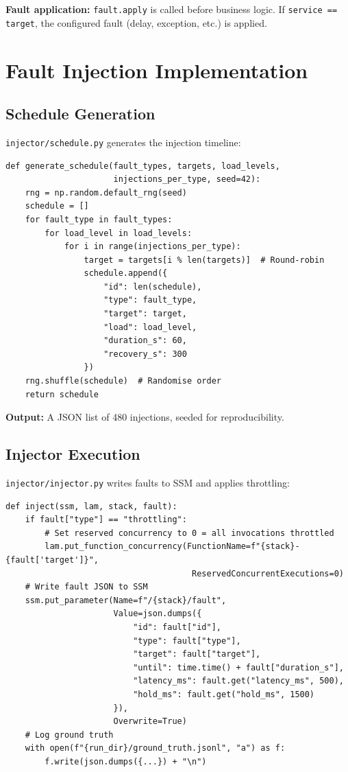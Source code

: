 \textbf{Fault application:} \texttt{fault.apply} is called before business logic. If \texttt{service == target}, the configured fault (delay, exception, etc.) is applied.

\section{Fault Injection Implementation}

\subsection{Schedule Generation}

\texttt{injector/schedule.py} generates the injection timeline:

\begin{verbatim}
def generate_schedule(fault_types, targets, load_levels,
                      injections_per_type, seed=42):
    rng = np.random.default_rng(seed)
    schedule = []
    for fault_type in fault_types:
        for load_level in load_levels:
            for i in range(injections_per_type):
                target = targets[i % len(targets)]  # Round-robin
                schedule.append({
                    "id": len(schedule),
                    "type": fault_type,
                    "target": target,
                    "load": load_level,
                    "duration_s": 60,
                    "recovery_s": 300
                })
    rng.shuffle(schedule)  # Randomise order
    return schedule
\end{verbatim}

\textbf{Output:} A JSON list of 480 injections, seeded for reproducibility.

\subsection{Injector Execution}

\texttt{injector/injector.py} writes faults to SSM and applies throttling:

\begin{verbatim}
def inject(ssm, lam, stack, fault):
    if fault["type"] == "throttling":
        # Set reserved concurrency to 0 = all invocations throttled
        lam.put_function_concurrency(FunctionName=f"{stack}-{fault['target']}",
                                      ReservedConcurrentExecutions=0)
    # Write fault JSON to SSM
    ssm.put_parameter(Name=f"/{stack}/fault",
                      Value=json.dumps({
                          "id": fault["id"],
                          "type": fault["type"],
                          "target": fault["target"],
                          "until": time.time() + fault["duration_s"],
                          "latency_ms": fault.get("latency_ms", 500),
                          "hold_ms": fault.get("hold_ms", 1500)
                      }),
                      Overwrite=True)
    # Log ground truth
    with open(f"{run_dir}/ground_truth.jsonl", "a") as f:
        f.write(json.dumps({...}) + "\n")
\end{verbatim}

